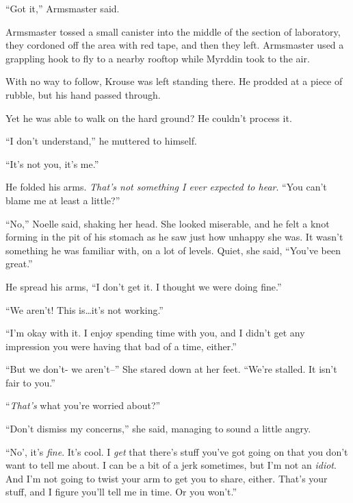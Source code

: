 ``Got it,'' Armsmaster said.



Armsmaster tossed a small canister into the middle of the section of laboratory, they cordoned off the area with red tape, and then they left.  Armsmaster used a grappling hook to fly to a nearby rooftop while Myrddin took to the air.  



With no way to follow, Krouse was left standing there.  He prodded at a piece of rubble, but his hand passed through.



Yet he was able to walk on the hard ground?  He couldn't process it.



``I don't understand,'' he muttered to himself.



``It's not you, it's me.''



He folded his arms.  \emph{That's not something I ever expected to hear}.  ``You can't blame me at least a little?''



``No,'' Noelle said, shaking her head.  She looked miserable, and he felt a knot forming in the pit of his stomach as he saw just how unhappy she was.  It wasn't something he was familiar with, on a lot of levels.  Quiet, she said, ``You've been great.''



He spread his arms, ``I don't get it.  I thought we were doing fine.''



``We aren't!  This is\ldots it's not working.''



``I'm okay with it.  I enjoy spending time with you, and I didn't get any impression you were having that bad of a time, either.''



``But we don't- we aren't--''  She stared down at her feet.  ``We're stalled.  It isn't fair to you.''



``\emph{That's} what you're worried about?''



``Don't dismiss my concerns,'' she said, managing to sound a little angry.



``No', it's \emph{fine}.  It's cool.  I \emph{get} that there's stuff you've got going on that you don't want to tell me about.  I can be a bit of a jerk sometimes, but I'm not an \emph{idiot}.  And I'm not going to twist your arm to get you to share, either.  That's your stuff, and I figure you'll tell me in time.  Or you won't.''



